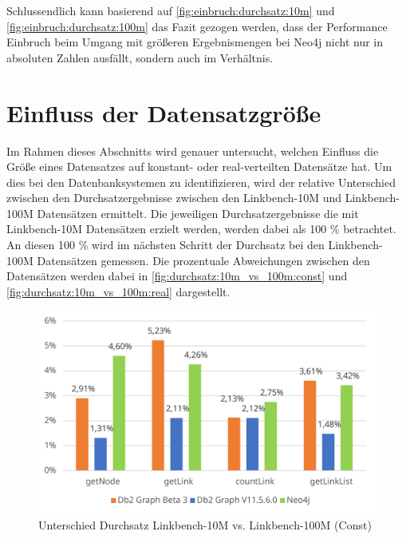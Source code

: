 Schlussendlich kann basierend auf \autoref{fig:einbruch:durchsatz:10m} und \autoref{fig:einbruch:durchsatz:100m} das Fazit gezogen werden, dass der Performance Einbruch beim Umgang mit größeren Ergebnismengen bei Neo4j nicht nur in absoluten Zahlen ausfällt, sondern auch im Verhältnis.

\section{Einfluss der Datensatzgröße}
\label{auswertung:groesse}
Im Rahmen dieses Abschnitts wird genauer untersucht, welchen Einfluss die Größe eines Datensatzes auf konstant- oder real-verteilten Datensätze hat. Um dies bei den Datenbanksystemen zu identifizieren, wird der relative Unterschied zwischen den Durchsatzergebnisse zwischen den Linkbench-10M und Linkbench-100M Datensätzen ermittelt. Die jeweiligen Durchsatzergebnisse die mit Linkbench-10M Datensätzen erzielt werden, werden dabei als 100 \% betrachtet. An diesen 100 \% wird im nächsten Schritt der Durchsatz bei den Linkbench-100M Datensätzen gemessen. Die prozentuale Abweichungen zwischen den Datensätzen werden dabei in \autoref{fig:durchsatz:10m_vs_100m:const} und \autoref{fig:durchsatz:10m_vs_100m:real} dargestellt.

\begin{figure}[!ht]
    \centering
    \includegraphics[width=\textwidth]{images/diagramme/difference_durchsatz_const_10m_vs_100m.pdf}
    \caption{Unterschied Durchsatz Linkbench-10M vs. Linkbench-100M (Const)}
    \label{fig:durchsatz:10m_vs_100m:const}
\end{figure}


